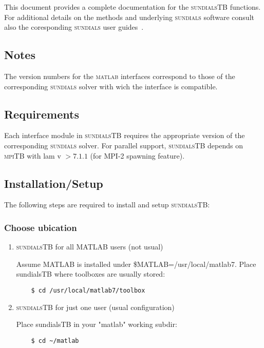 \documentclass[titlepage,10pt]{article}
\newcommand{\sundialsTB}{{\normalfont\scshape sundialsTB}}
\newcommand{\sundials}{{\normalfont\scshape sundials}}
\newcommand{\matlab}{{\normalfont\scshape matlab}}
\newcommand{\mpiTB}{{\normalfont\scshape mpiTB}}
\begin{document}
This document provides a complete documentation for the {\sundialsTB} functions.
For additional details on the methods and underlying {\sundials} software consult
also the coresponding {\sundials} user guides~\cite{cvodes_ug,kinsol_ug}.

\subsection{Notes}

The version numbers for the {\matlab} interfaces correspond to those of the 
corresponding {\sundials} solver with wich the interface is compatible.

\subsection{Requirements}

Each interface module in {\sundialsTB} requires the appropriate version of the 
corresponding {\sundials} solver. For parallel support, {\sundialsTB} depends on
{\mpiTB} with {\sc lam} v $> 7.1.1$ (for MPI-2 spawning feature).

\subsection{Installation/Setup} 

The following steps are required to install and setup {\sundialsTB}:

\subsubsection{Choose ubication}

\begin{enumerate}

\item 
  {\sundialsTB} for all MATLAB users (not usual)

  Assume MATLAB is installed under \$MATLAB=/usr/local/matlab7.
  Place sundialsTB where toolboxes are usually stored:
\begin{verbatim}
    $ cd /usr/local/matlab7/toolbox
\end{verbatim}

\item 
  {\sundialsTB} for just one user (usual configuration)

  Place sundialsTB in your "matlab" working subdir:
\begin{verbatim}
    $ cd ~/matlab
\end{verbatim}

\end{enumerate}
\end{document}

